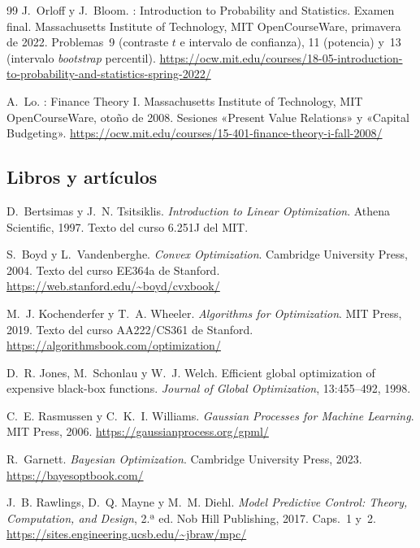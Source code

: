 \begin{thebibliography}{99}
J.~Orloff y J.~Bloom.
: Introduction to Probability and Statistics. Examen final.
\newblock Massachusetts Institute of Technology, MIT OpenCourseWare, primavera de 2022. Problemas~9 (contraste $t$ e intervalo de confianza), 11 (potencia) y~13 (intervalo \emph{bootstrap} percentil).
\newblock \url{https://ocw.mit.edu/courses/18-05-introduction-to-probability-and-statistics-spring-2022/}

A.~Lo.
: Finance Theory I.
\newblock Massachusetts Institute of Technology, MIT OpenCourseWare, otoño de 2008. Sesiones «Present Value Relations» y «Capital Budgeting».
\newblock \url{https://ocw.mit.edu/courses/15-401-finance-theory-i-fall-2008/}

\subsection*{Libros y artículos}

D.~Bertsimas y J.~N. Tsitsiklis.
\newblock \emph{Introduction to Linear Optimization}.
\newblock Athena Scientific, 1997. Texto del curso 6.251J del MIT.

S.~Boyd y L.~Vandenberghe.
\newblock \emph{Convex Optimization}.
\newblock Cambridge University Press, 2004. Texto del curso EE364a de Stanford.
\newblock \url{https://web.stanford.edu/~boyd/cvxbook/}

M.~J. Kochenderfer y T.~A. Wheeler.
\newblock \emph{Algorithms for Optimization}.
\newblock MIT Press, 2019. Texto del curso AA222/CS361 de Stanford.
\newblock \url{https://algorithmsbook.com/optimization/}

D.~R. Jones, M.~Schonlau y W.~J. Welch.
\newblock Efficient global optimization of expensive black-box functions.
\newblock \emph{Journal of Global Optimization}, 13:455--492, 1998.

C.~E. Rasmussen y C.~K.~I. Williams.
\newblock \emph{Gaussian Processes for Machine Learning}.
\newblock MIT Press, 2006.
\newblock \url{https://gaussianprocess.org/gpml/}

R.~Garnett.
\newblock \emph{Bayesian Optimization}.
\newblock Cambridge University Press, 2023.
\newblock \url{https://bayesoptbook.com/}

J.~B. Rawlings, D.~Q. Mayne y M.~M. Diehl.
\newblock \emph{Model Predictive Control: Theory, Computation, and Design}, 2.ª ed.
\newblock Nob Hill Publishing, 2017. Caps.~1 y~2.
\newblock \url{https://sites.engineering.ucsb.edu/~jbraw/mpc/}


\end{thebibliography}
